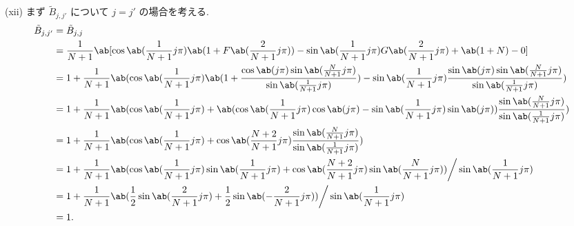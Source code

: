 \documentclass[uplatex,diffipdfmx,a4paper,11pt]{jlreq}
\theoremstyle{definition}
\begin{document}
(xii) まず $\tilde{B}_{j,j'}$ について $j = j'$ の場合を考える.
\begin{align}
  \tilde{B}_{j,j'} & = \tilde{B}_{j,j}                                                                                                                                                                                                                            \\
                   & = \frac{1}{N+1}\ab[\cos\ab(\frac{1}{N+1}j\pi)\ab(1 + F\ab(\frac{2}{N+1}j\pi)) - \sin\ab(\frac{1}{N+1}j\pi)G\ab(\frac{2}{N+1}j\pi) + \ab(1 + N) - 0]                                                                                          \\
                   & = 1 + \frac{1}{N+1}\ab(\cos\ab(\frac{1}{N+1}j\pi)\ab(1 + \frac{\cos\ab(j\pi)\sin\ab(\frac{N}{N+1}j\pi)}{\sin\ab(\frac{1}{N+1}j\pi)}) - \sin\ab(\frac{1}{N+1}j\pi)\frac{\sin\ab(j\pi)\sin\ab(\frac{N}{N+1}j\pi)}{\sin\ab(\frac{1}{N+1}j\pi)}) \\
                   & = 1 + \frac{1}{N+1}\ab(\cos\ab(\frac{1}{N+1}j\pi) + \ab(\cos\ab(\frac{1}{N+1}j\pi)\cos\ab(j\pi) - \sin\ab(\frac{1}{N+1}j\pi)\sin\ab(j\pi))\frac{\sin\ab(\frac{N}{N+1}j\pi)}{\sin\ab(\frac{1}{N+1}j\pi)})                                     \\
                   & = 1 + \frac{1}{N+1}\ab(\cos\ab(\frac{1}{N+1}j\pi) + \cos\ab(\frac{N+2}{N+1}j\pi)\frac{\sin\ab(\frac{N}{N+1}j\pi)}{\sin\ab(\frac{1}{N+1}j\pi)})                                                                                               \\
                   & = 1 + \frac{1}{N+1}\ab(\cos\ab(\frac{1}{N+1}j\pi)\sin\ab(\frac{1}{N+1}j\pi) + \cos\ab(\frac{N+2}{N+1}j\pi)\sin\ab(\frac{N}{N+1}j\pi))\bigg/\sin\ab(\frac{1}{N+1}j\pi)                                                                        \\
                   & = 1 + \frac{1}{N+1}\ab(\frac{1}{2}\sin\ab(\frac{2}{N+1}j\pi) + \frac{1}{2}\sin\ab(-\frac{2}{N+1}j\pi))\bigg/\sin\ab(\frac{1}{N+1}j\pi)                                                                                                       \\
                   & = 1.
\end{align}
\end{document}

